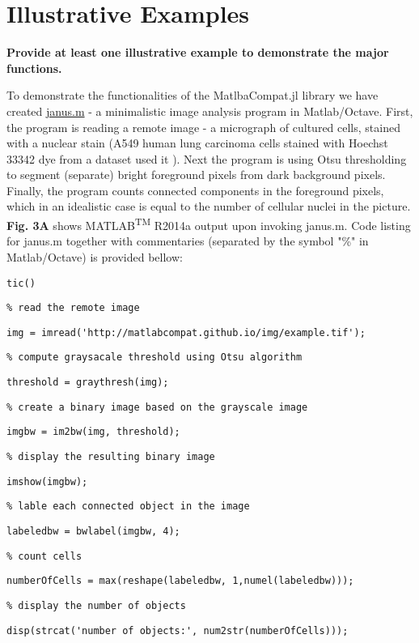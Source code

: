 \section{Illustrative Examples}
\label{} 

\textbf{Provide at least one illustrative example to demonstrate the major functions.}

To demonstrate the functionalities of the MatlbaCompat.jl library we have created \href{https://github.com/MatlabCompat/MatlabCompat.jl/blob/dev/test/janus.m}{janus.m} - a minimalistic image analysis program in Matlab/Octave. First, the program is reading a remote image - a micrograph of cultured cells, stained with a nuclear stain (A549 human lung carcinoma cells stained with Hoechst 33342 dye from a dataset used it \cite{22787215}). Next the program is using Otsu \cite{otsu1975threshold} thresholding to segment (separate) bright foreground pixels from dark background pixels. Finally, the program counts connected components in the foreground pixels, which in an idealistic case is equal to the number of cellular nuclei in the picture. \textbf{Fig. 3A} shows MATLAB\textsuperscript{TM} R2014a output upon invoking janus.m. Code listing for janus.m together with commentaries (separated by the symbol "\%" in Matlab/Octave) is provided bellow:



\verb|tic()|

\verb|% read the remote image|

\verb|img = imread('http://matlabcompat.github.io/img/example.tif');|

\verb|% compute graysacale threshold using Otsu algorithm|

\verb|threshold = graythresh(img);|

\verb|% create a binary image based on the grayscale image|

\verb|imgbw = im2bw(img, threshold);|

\verb|% display the resulting binary image|

\verb|imshow(imgbw);|

\verb|% lable each connected object in the image|

\verb|labeledbw = bwlabel(imgbw, 4);|

\verb|% count cells|

\verb|numberOfCells = max(reshape(labeledbw, 1,numel(labeledbw)));|

\verb|% display the number of objects|

\verb|disp(strcat('number of objects:', num2str(numberOfCells)));|

